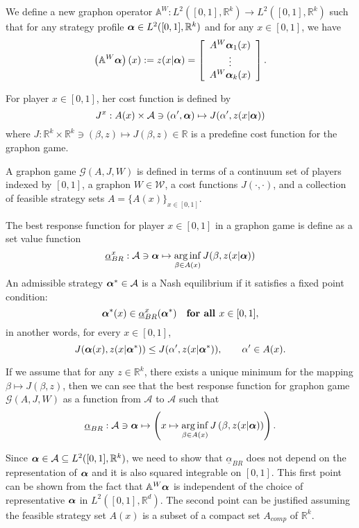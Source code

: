 We define a new graphon operator $\mathbb{A}^W: L^2([0,1], \mathbb{R}^k) \to L^2([0,1], \mathbb{R}^k)$ such that for any strategy profile $\boldsymbol{\alpha} \in L^2([0,1], \mathbb{R}^k)$ and for any $x \in [0,1]$, we have
$$
	\left( \mathbb{A}^W \boldsymbol{\alpha} \right)(x) := z(x | \boldsymbol{\alpha}) = \left[ \begin{array}{c} A^W \boldsymbol{\alpha}_1 (x) \\ \vdots \\ A^W \boldsymbol{\alpha}_k (x)  \end{array} \right].
$$

For player $x \in [0,1]$, her cost function is defined by 
$$
J^x: A(x) \times \mathcal{A} \ni (\alpha' , \boldsymbol{\alpha}) \mapsto J(\alpha', z(x|\boldsymbol{\alpha}))
$$
where $J: \mathbb{R}^k \times \mathbb{R}^k \ni (\beta, z) \mapsto J(\beta,z) \in \mathbb{R}$ is a predefine cost function for the graphon game. 

\begin{definition}
	A graphon game $\mathcal{G}(A, J, W)$ is defined in terms of a continuum set of players indexed by $[0,1]$, a graphon $W \in \mathcal{W}$, a cost functions $J(\cdot, \cdot)$, and a collection of feasible strategy sets $A = \{A(x)\}_{x \in [0,1]}$. 
\end{definition}

The best response function for player $x\in [0,1]$ in a graphon game is define as a set value function
$$
	\underline{\alpha}_{BR}^x : \mathcal{A} \ni \boldsymbol{\alpha} \mapsto \operatorname*{arg\,inf}_{\beta \in A(x)} J(\beta, z(x|\boldsymbol{\alpha}))
$$
An admissible strategy $\boldsymbol{\alpha}^* \in \mathcal{A}$ is a Nash equilibrium if it satisfies a fixed point condition:
$$
\boldsymbol{\alpha}^*(x) \in \underline{\alpha}^x_{BR}(\boldsymbol{\alpha}^*) \quad \textbf{for all } x \in [0,1], 
$$
in another words, for every $x \in [0,1]$, 
$$
	J(\boldsymbol{\alpha}(x), z(x | \boldsymbol{\alpha}^*)) \leq J( \alpha', z(x|\boldsymbol{\alpha}^*) ), \qquad \alpha' \in A(x).
$$



\begin{remark}
If we assume that for any $z \in \mathbb{R}^k$, there exists a unique minimum for the mapping $\beta \mapsto J(\beta, z)$, then we can see that the best response function for graphon game $\mathcal{G}(A,J,W)$ as a function from $\mathcal{A}$ to $\mathcal{A}$ such that
$$
	\underline{\alpha}_{BR} : \mathcal{A} \ni \boldsymbol{\alpha} \mapsto \left(x \mapsto \operatorname*{arg\,inf}_{\beta \in A(x) } J\left(\beta, z(x | \boldsymbol{\alpha}) \right) \right).
$$

Since $\boldsymbol{\alpha} \in \mathcal{A} \subseteq L^2([0,1], \mathbb{R}^k)$, we need to show that $\underline{\alpha}_{BR}$ does not depend on the representation of $\boldsymbol{\alpha}$ and it is also squared integrable on $[0,1]$. This first point can be shown from the fact that $\mathbb{A}^W\boldsymbol{\alpha}$ is independent of the choice of representative $\boldsymbol{\alpha}$ in $L^2([0,1], \mathbb{R}^d)$. The second point can be justified assuming the feasible strategy set $A(x)$ is a subset of a compact set $A_{comp}$ of $\mathbb{R}^k$. 
\end{remark}

